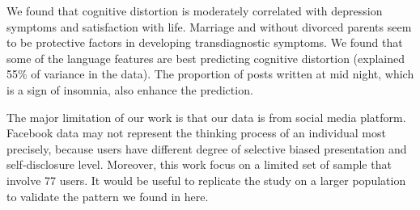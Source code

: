 We found that cognitive distortion is moderately correlated with depression symptoms and satisfaction with life. Marriage and without divorced parents seem to be protective factors in developing transdiagnostic symptoms. We found that some of the language features are best predicting cognitive distortion (explained 55\% of variance in the data). The proportion of posts written at mid night, which is a sign of insomnia, also enhance the prediction. 

The major limitation of our work is that our data is from social media platform. Facebook data may not represent the thinking process of an individual most precisely, because users have different degree of selective biased presentation and self-disclosure level. Moreover, this work focus on a limited set of sample that involve 77 users. It would be useful to replicate the study on a larger population to validate the pattern we found in here. 




